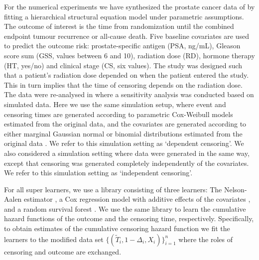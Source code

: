 \documentclass[a4paper,danish]{article}
\newcommand{\1}{\mathds{1}}
\theoremstyle{plain} %
\numberwithin{theorem}{section}
\theoremstyle{definition} %
\theoremstyle{remark}
\begin{document}
For the numerical experiments we have synthesized the prostate cancer
data of \cite{kattan2000pretreatment} by fitting a hierarchical
structural equation model under parametric assumptions. The outcome of
interest is the time from randomization until the combined endpoint
tumour recurrence or all-cause death. Five baseline covariates are
used to predict the outcome risk: prostate-specific antigen (PSA,
ng/mL), Gleason score sum (GSS, values between 6 and 10), radiation
dose (RD), hormone therapy (HT, yes/no) and clinical stage (CS, six
values). The study was designed such that a patient's radiation dose
depended on when the patient entered the study. This in turn implies
that the time of censoring depends on the radiation dose. The data
were re-analysed in \citep{gerds2013estimating} where a sensitivity
analysis was conducted based on simulated data. Here we use the same
simulation setup, where event and censoring times are generated
according to parametric Cox-Weibull models \citep{Bender2005}
estimated from the original data, and the covariates are generated
according to either marginal Gaussian normal or binomial distributions
estimated from the original data
\citep[c.f.,][Section~4.6]{gerds2013estimating}. We refer to this
simulation setting as `dependent censoring'. We also considered a
simulation setting where data were generated in the same way, except
that censoring was generated completely independently of the
covariates. We refer to this simulation setting as `independent
censoring'.

For all super learners, we use a library consisting of three learners:
The Nelson-Aalen estimator \citep{andersen2012statistical}, a Cox
regression model with additive effects of the covariates
\citep{cox1972regression}, and a random survival forest
\citep{ishwaran2008random}. We use the same library to learn the
cumulative hazard functions of the outcome and the censoring time,
respectively. Specifically, to obtain estimates of the cumulative
censoring hazard function we fit the learners to the modified data set
\(\{(\tilde{T}_i, 1-\Delta_i, X_i)\}_{i=1}^n \) where the roles of
censoring and outcome are exchanged.
\end{document}
